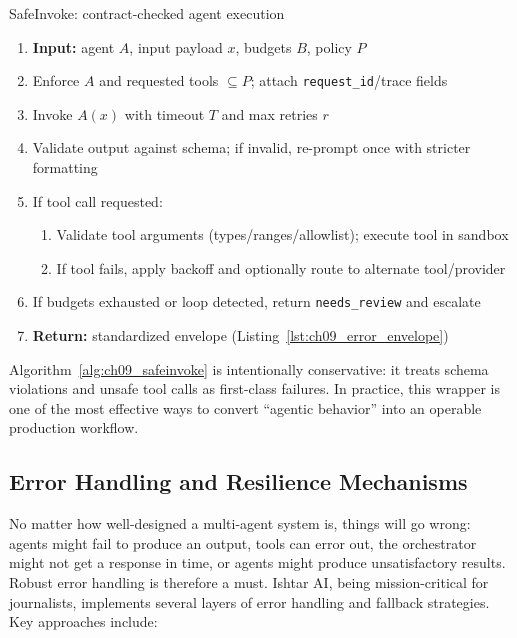 \begin{llmalgobox}{SafeInvoke: contract-checked agent execution}
\label{alg:ch09_safeinvoke}
\small
\begin{enumerate}[leftmargin=1.4em, itemsep=2pt]
  \item \textbf{Input:} agent $A$, input payload $x$, budgets $B$, policy $P$
  \item Enforce $A$ and requested tools $\subseteq P$; attach \texttt{request\_id}/trace fields
  \item Invoke $A(x)$ with timeout $T$ and max retries $r$
  \item Validate output against schema; if invalid, re-prompt once with stricter formatting
  \item If tool call requested:
    \begin{enumerate}[leftmargin=1.2em, itemsep=1pt]
      \item Validate tool arguments (types/ranges/allowlist); execute tool in sandbox
      \item If tool fails, apply backoff and optionally route to alternate tool/provider
    \end{enumerate}
  \item If budgets exhausted or loop detected, return \texttt{needs\_review} and escalate
  \item \textbf{Return:} standardized envelope (Listing~\ref{lst:ch09_error_envelope})
\end{enumerate}
\end{llmalgobox}

\noindent Algorithm~\ref{alg:ch09_safeinvoke} is intentionally conservative: it treats schema violations and unsafe tool calls as first-class failures.
In practice, this wrapper is one of the most effective ways to convert ``agentic behavior'' into an operable production workflow.

\subsection*{Error Handling and Resilience Mechanisms}
No matter how well-designed a multi-agent system is, things will go wrong: agents might fail to produce an output, tools can error out, the orchestrator might not get a response in time, or agents might produce unsatisfactory results. Robust error handling is therefore a must. Ishtar AI, being mission-critical for journalists, implements several layers of error handling and fallback strategies. Key approaches include:

